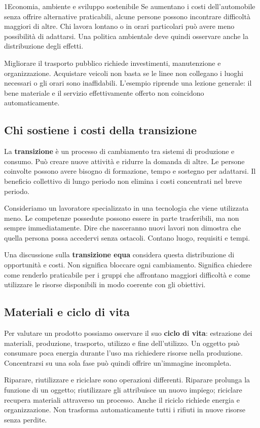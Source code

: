 \begin{lettura}{1}{Economia, ambiente e sviluppo sostenibile}
Se aumentano i costi dell'automobile senza offrire alternative praticabili, alcune persone possono incontrare difficoltà maggiori di altre. Chi lavora lontano o in orari particolari può avere meno possibilità di adattarsi. Una politica ambientale deve quindi osservare anche la distribuzione degli effetti.

Migliorare il trasporto pubblico richiede investimenti, manutenzione e organizzazione. Acquistare veicoli non basta se le linee non collegano i luoghi necessari o gli orari sono inaffidabili. L'esempio riprende una lezione generale: il bene materiale e il servizio effettivamente offerto non coincidono automaticamente.

\subsection*{Chi sostiene i costi della transizione}
La \textbf{transizione} è un processo di cambiamento tra sistemi di produzione e consumo. Può creare nuove attività e ridurre la domanda di altre. Le persone coinvolte possono avere bisogno di formazione, tempo e sostegno per adattarsi. Il beneficio collettivo di lungo periodo non elimina i costi concentrati nel breve periodo.

Consideriamo un lavoratore specializzato in una tecnologia che viene utilizzata meno. Le competenze possedute possono essere in parte trasferibili, ma non sempre immediatamente. Dire che nasceranno nuovi lavori non dimostra che quella persona possa accedervi senza ostacoli. Contano luogo, requisiti e tempi.

Una discussione sulla \textbf{transizione equa} considera questa distribuzione di opportunità e costi. Non significa bloccare ogni cambiamento. Significa chiedere come renderlo praticabile per i gruppi che affrontano maggiori difficoltà e come utilizzare le risorse disponibili in modo coerente con gli obiettivi.

\subsection*{Materiali e ciclo di vita}
Per valutare un prodotto possiamo osservare il suo \textbf{ciclo di vita}: estrazione dei materiali, produzione, trasporto, utilizzo e fine dell'utilizzo. Un oggetto può consumare poca energia durante l'uso ma richiedere risorse nella produzione. Concentrarsi su una sola fase può quindi offrire un'immagine incompleta.

Riparare, riutilizzare e riciclare sono operazioni differenti. Riparare prolunga la funzione di un oggetto; riutilizzare gli attribuisce un nuovo impiego; riciclare recupera materiali attraverso un processo. Anche il riciclo richiede energia e organizzazione. Non trasforma automaticamente tutti i rifiuti in nuove risorse senza perdite.


\end{lettura}
